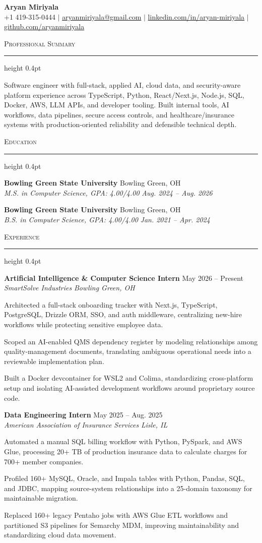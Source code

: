 \documentclass[letterpaper,11pt]{article}
\newcommand{\resumesection}[1]{%
  \par\vspace{2pt}%
  {\large\scshape #1}\par\vspace{2pt}%
  \hrule height 0.4pt\vspace{2pt}%
}
\newcommand{\resumeSubheading}[4]{
  \textbf{#1} \hfill #2\\
  \textit{#3} \hfill \textit{#4}
}
\begin{document}
\begin{center}
  {\LARGE \textbf{Aryan Miriyala}}\\[-1pt]
  \small
  +1 419-315-0444 $|$
  \href{mailto:aryanmiriyala@gmail.com}{aryanmiriyala@gmail.com} $|$
  \href{https://www.linkedin.com/in/aryan-miriyala-7788a21b6/}{linkedin.com/in/aryan-miriyala} $|$
  \href{https://github.com/aryanmiriyala}{github.com/aryanmiriyala}
\end{center}\vspace{-10pt}

\resumesection{Professional Summary}
Software engineer with full-stack, applied AI, cloud data, and security-aware platform experience across TypeScript, Python, React/Next.js, Node.js, SQL, Docker, AWS, LLM APIs, and developer tooling. Built internal tools, AI workflows, data pipelines, secure access controls, and healthcare/insurance systems with production-oriented reliability and defensible technical depth.

\resumesection{Education}
\resumeSubheading
{Bowling Green State University}{Bowling Green, OH}
{M.S. in Computer Science, GPA: 4.00/4.00}{Aug. 2024 -- Aug. 2026}

\resumeSubheading
{Bowling Green State University}{Bowling Green, OH}
{B.S. in Computer Science, GPA: 4.00/4.00}{Jan. 2021 -- Apr. 2024}

\resumesection{Experience}
\resumeSubheading
{Artificial Intelligence \& Computer Science Intern}{May 2026 -- Present}
{SmartSolve Industries}{Bowling Green, OH}
\begin{tightitemize}
  \item Architected a full-stack onboarding tracker with Next.js, TypeScript, PostgreSQL, Drizzle ORM, SSO, and auth middleware, centralizing new-hire workflows while protecting sensitive employee data.
  \item Scoped an AI-enabled QMS dependency register by modeling relationships among quality-management documents, translating ambiguous operational needs into a reviewable implementation plan.
  \item Built a Docker devcontainer for WSL2 and Colima, standardizing cross-platform setup and isolating AI-assisted development workflows around proprietary source code.
\end{tightitemize}

\resumeSubheading
{Data Engineering Intern}{May 2025 -- Aug. 2025}
{American Association of Insurance Services}{Lisle, IL}
\begin{tightitemize}
  \item Automated a manual SQL billing workflow with Python, PySpark, and AWS Glue, processing 20+ TB of production insurance data to calculate charges for 700+ member companies.
  \item Profiled 160+ MySQL, Oracle, and Impala tables with Python, Pandas, SQL, and JDBC, mapping source-system relationships into a 25-domain taxonomy for maintainable migration.
  \item Replaced 160+ legacy Pentaho jobs with AWS Glue ETL workflows and partitioned S3 pipelines for Semarchy MDM, improving maintainability and standardizing cloud data movement.
\end{tightitemize}
\end{document}
